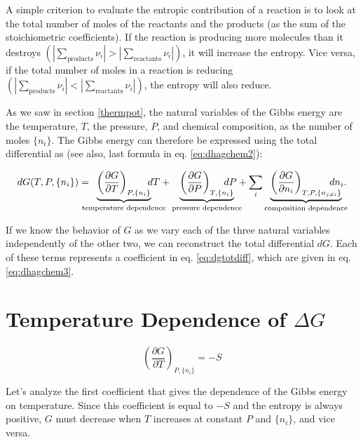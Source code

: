 \documentclass[
  9pt,
]{extbook}
\theoremstyle{definition}
\theoremstyle{definition}
\theoremstyle{definition}
\theoremstyle{definition}
\theoremstyle{remark}
\begin{document}
A simple criterion to evaluate the entropic contribution of a reaction is to look at the total number of moles of the reactants and the products (as the sum of the stoichiometric coefficients). If the reaction is producing more molecules than it destroys \(\left( \left| \sum_\text{products} \nu_i \right| > \left| \sum_\text{reactants} \nu_i \right| \right)\), it will increase the entropy. Vice versa, if the total number of moles in a reaction is reducing \(\left( \left| \sum_\text{products} \nu_i \right| < \left| \sum_\text{reactants} \nu_i \right| \right)\), the entropy will also reduce.

As we saw in section \ref{thermpot}, the natural variables of the Gibbs energy are the temperature, \(T\), the pressure, \(P\), and chemical composition, as the number of moles \(\{n_i\}\). The Gibbs energy can therefore be expressed using the total differential as (see also, last formula in eq. \eqref{eq:dhagchem2}):

\begin{equation}
dG(T,P,\{n_i\}) = \mkern-18mu \underbrace{\left(\frac{\partial G}{\partial T} \right)_{P,\{n_i\}}}_{\text{temperature dependence}} \mkern-36mu dT + \underbrace{\left(\frac{\partial G}{\partial P} \right)_{T,\{n_i\}}}_{\text{pressure dependence}} \mkern-36mu dP + \sum_i \underbrace{\left(\frac{\partial G}{\partial n_i} \right)_{T,P,\{n_{j \neq i}\}}}_{\text{composition dependence}} \mkern-36mu dn_i.
\label{eq:dgtotdiff}
\end{equation}

If we know the behavior of \(G\) as we vary each of the three natural variables independently of the other two, we can reconstruct the total differential \(dG\). Each of these terms represents a coefficient in eq. \eqref{eq:dgtotdiff}, which are given in eq. \eqref{eq:dhagchem3}.

\section{\texorpdfstring{Temperature Dependence of \(\Delta G\)}{Temperature Dependence of \textbackslash Delta G}}\label{temperature-dependence-of-delta-g}

\[
\left(\frac{\partial G}{\partial T} \right)_{P,\{n_i\}}=-S
\]

Let's analyze the first coefficient that gives the dependence of the Gibbs energy on temperature. Since this coefficient is equal to \(-S\) and the entropy is always positive, \(G\) must decrease when \(T\) increases at constant \(P\) and \(\{n_i\}\), and vice versa.
\end{document}
